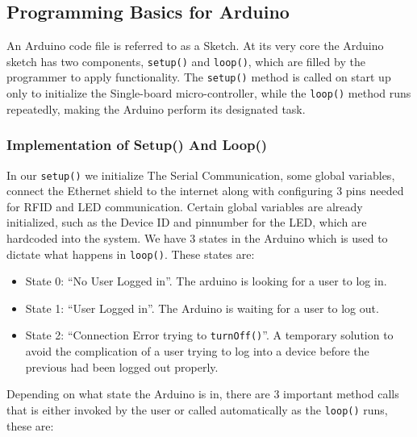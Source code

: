 \subsection{Programming Basics for Arduino}
\label{ProgrammingBasicsforArduino}

An Arduino code file is referred to as a Sketch. At its very core the Arduino sketch has two components, \verb|setup()| and \verb|loop()|, which are filled by the programmer to apply functionality.
The \verb|setup()| method is called on start up only to initialize the Single-board micro-controller, while the \verb|loop()| method runs repeatedly, making the Arduino perform its designated task.

\subsubsection*{Implementation of Setup() And Loop()}
In our \verb|setup()| we initialize The Serial Communication, some global variables, connect the Ethernet shield to the internet along with configuring 3 pins needed for RFID and LED communication. Certain global variables are already initialized, such as the Device ID and pinnumber for the LED, which are hardcoded into the system.\newline
We have 3 states in the Arduino which is used to dictate what happens in \verb|loop()|. These states are:
\begin{itemize}
	\item State 0: ``No User Logged in''. The arduino is looking for a user to log in.
	\item State 1: ``User Logged in''. The Arduino is waiting for a user to log out.
	\item State 2: ``Connection Error trying to \verb|turnOff()|''. A temporary solution to avoid the complication of a user trying to log into a device before the previous had been logged out properly.
\end{itemize}
Depending on what state the Arduino is in, there are 3 important method calls that is either invoked by the user or called automatically as the \verb|loop()| runs, these are:
